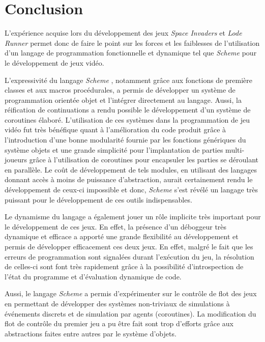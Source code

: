 \documentclass[12pt,twoside,letterpaper,francais]{book}
\newcommand{\lr}{{\textit{Lode Runner }}}
\newcommand{\si}{{\textit{Space Invaders }}}
\newcommand{\Schemelang}{{\textit{Scheme }}}
\begin{document}
\clearpage

\chapter{Conclusion}
L'expérience acquise lors du développement des jeux \si et \lr permet
donc de faire le point sur les forces et les faiblesses de
l'utilisation d'un langage de programmation fonctionnelle et dynamique
tel que \Schemelang pour le développement de jeux vidéo.

L'expressivité du langage \Schemelang, notamment grâce aux fonctions
de première classes et aux macros procédurales, a permis de développer
un système de programmation orientée objet et l'intégrer directement
au langage. Aussi, la réification de continuations a rendu possible le
développement d'un système de coroutines élaboré.  L'utilisation de
ces systèmes dans la programmation de jeu vidéo fut très bénéfique
quant à l'amélioration du code produit grâce à l'introduction d'une
bonne modularité fournie par les fonctions génériques du système
objets et une grande simplicité pour l'implantation de parties
multi-joueurs grâce à l'utilisation de coroutines pour encapsuler les
parties se déroulant en parallèle. Le coût de développement de tels
modules, en utilisant des langages donnant accès à moins de puissance
d'abstraction, aurait certainement rendu le développement de ceux-ci
impossible et donc, \Schemelang s'est révélé un langage très puissant
pour le développement de ces outils indispensables.

Le dynamisme du langage a également jouer un rôle implicite très
important pour le développement de ces jeux. En effet, la présence
d'un déboggeur très dynamique et efficace a apporté une grande
flexibilité au développement et permis de développer efficacement ces
deux jeux. En effet, malgré le fait que les erreurs de programmation
sont signalées durant l'exécution du jeu, la résolution de celles-ci
sont font très rapidement grâce à la possibilité d'introspection de
l'état du programme et d'évaluation dynamique de code.

Aussi, le langage \Schemelang a permis d'expérimenter sur le contrôle
de flot des jeux en permettant de développer des systèmes non-triviaux
de simulations à événements discrets et de simulation par agents
(coroutines). La modification du flot de contrôle du premier jeu a pu
être fait sont trop d'efforts grâce aux abstractions faites entre
autres par le système d'objets.
\end{document}

